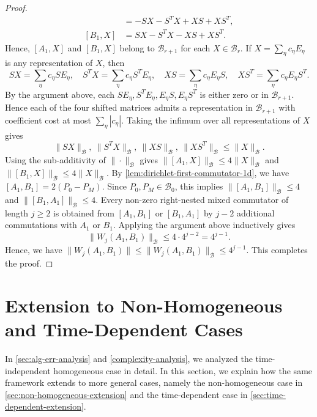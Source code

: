\documentclass[10pt,reqno]{article}
\numberwithin{equation}{section}
\theoremstyle{plain}
\theoremstyle{definition}
\begin{document}
\begin{proof}
\begin{align}
[A_1,X] &= -SX - S^T X + XS + XS^T, \\ [B_1,X] &= SX - S^T X - XS + XS^T.
\end{align}
Hence, \([A_1,X]\) and \([B_1,X]\) belong to \(\mathcal B_{r+1}\) for each \(X \in \mathcal B_r\). If \(X=\sum_\eta c_\eta E_\eta\) is any representation of \(X\), then
\begin{equation}
SX=\sum_\eta c_\eta SE_\eta, \quad S^TX=\sum_\eta c_\eta S^TE_\eta, \quad XS=\sum_\eta c_\eta E_\eta S, \quad XS^T=\sum_\eta c_\eta E_\eta S^T.
\end{equation}
By the argument above, each \(SE_\eta,S^TE_\eta,E_\eta S,E_\eta S^T\) is either zero or in \(\mathcal B_{r+1}\). Hence each of the four shifted matrices admits a representation in $\mathcal{B}_{r+1}$ with coefficient cost at most \(\sum_\eta |c_\eta|\). Taking the infimum over all representations of \(X\) gives
\begin{equation}
\|SX\|_{\mathcal B},\ \|S^TX\|_{\mathcal B},\ \|XS\|_{\mathcal B},\ \|XS^T\|_{\mathcal B} \leq \|X\|_{\mathcal B}.
\end{equation}
Using the sub-additivity of \(\|\cdot\|_{\mathcal B}\) gives $\|[A_1,X]\|_{\mathcal B}\leq4\|X\|_{\mathcal B}$ and  $\|[B_1,X]\|_{\mathcal B}\leq4\|X\|_{\mathcal B}$. By \cref{lem:dirichlet-first-commutator-1d}, we have $[A_1,B_1]=2(P_0-P_M)$. Since \(P_0,P_M\in\mathcal B_0\), this implies $\|[A_1,B_1]\|_{\mathcal B}\leq4$ and  $\|[B_1,A_1]\|_{\mathcal B}\leq4$. Every non-zero right-nested mixed commutator of length \(j\geq2\) is obtained from \([A_1,B_1]\) or \([B_1,A_1]\) by \(j-2\) additional commutations with \(A_1\) or \(B_1\). Applying the argument above  inductively gives
\begin{equation}
\|W_j(A_1,B_1)\|_{\mathcal B}\leq4\cdot4^{j-2}=4^{j-1}.
\end{equation}
Hence, we have $\|W_j(A_1,B_1)\|\leq\|W_j(A_1,B_1)\|_{\mathcal B}\leq4^{j-1}$. This completes the proof.
\end{proof}


\section{Extension to Non-Homogeneous and Time-Dependent Cases}\label{sec:extensions}
In \cref{sec:alg-err-analysis} and \cref{complexity-analysis}, we analyzed the time-independent homogeneous case in detail. In this section, we explain how the same framework extends to more general cases, namely the non-homogeneous case in \cref{sec:non-homogeneous-extension} and the time-dependent case in \cref{sec:time-dependent-extension}.
\end{document}
